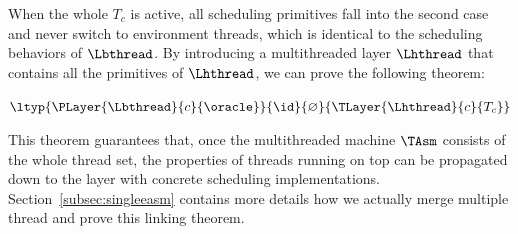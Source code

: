 When the whole $T_c$  is active,
 all scheduling primitives fall into the second case and never switch to environment threads, which is identical to the scheduling behaviors of $\Lbthread$. By introducing a multithreaded layer $\Lhthread$
 that contains all the primitives of $\Lhthread$, we can prove
the following theorem:
\begin{theorem}
\label{thread_composition}
\begin{small}
$\ltyp{\PLayer{\Lbthread}{c}{\oracle}}{\id}{\varnothing}{\TLayer{\Lhthread}{c}{T_c}}
$%
\end{small}
\end{theorem}%
\noindent This theorem guarantees that,
once the multithreaded machine $\TAsm$ consists of
the whole thread set,
 the properties of  threads running on top
can be propagated down to the layer with concrete
scheduling implementations.
\ifTRthen
Section~\ref{subsec:singleeasm} contains more details how we actually merge multiple thread and prove this linking theorem.
